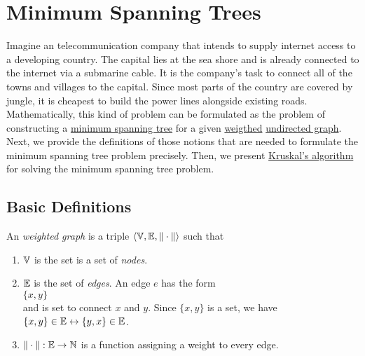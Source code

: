\pagebreak

\section{Minimum Spanning Trees}
Imagine an telecommunication company that intends to supply internet access to a developing country.
The capital lies at the sea shore and is already connected to the internet via a submarine cable. It
is the company's task to connect all of the towns and villages to the capital.  Since most parts of
the country are covered by jungle, it is cheapest to build the power lines alongside existing roads.  
Mathematically, this kind of problem can be formulated as the problem of constructing a 
\href{https://en.wikipedia.org/wiki/Minimum_spanning_tree}{minimum spanning tree} for a given 
\href{https://en.wikipedia.org/wiki/Graph_(discrete_mathematics)#Weighted_graph}{weigthed}
\href{https://en.wikipedia.org/wiki/Graph_(discrete_mathematics)#Undirected_graph}{undirected graph}.
Next, we provide the definitions of those notions that are needed to formulate the minimum spanning
tree problem precisely.  Then, we present
\href{https://en.wikipedia.org/wiki/Kruskal%27s_algorithm}{Kruskal's algorithm} for solving the
minimum spanning tree problem. 

\subsection{Basic Definitions}
\begin{Definition} An \emph{weighted graph} is a triple 
   $\langle {\mathbb V}, {\mathbb E}, \|\cdot\| \rangle$ such that
  \begin{enumerate}
  \item ${\mathbb V}$ is the set is a set of  \emph{nodes}.
  \item ${\mathbb E}$ is the set of  \emph{edges}.  An edge $e$ has the form
        \\[0.2cm]
        \hspace*{1.3cm}
        $\{x, y\}$
        \\[0.2cm]
        and is set to connect $x$ and $y$.  Since $\{x,y\}$ is a set, we have
        \\[0.2cm]
        \hspace*{1.3cm}
        $\{x,y\} \in {\mathbb E} \leftrightarrow \{y,x\} \in {\mathbb E}$.
  \item $\|\cdot\|: {\mathbb E} \rightarrow {\mathbb N}$ is a function assigning a 
        weight to every edge.
        \conclude
  \end{enumerate}
\end{Definition}


